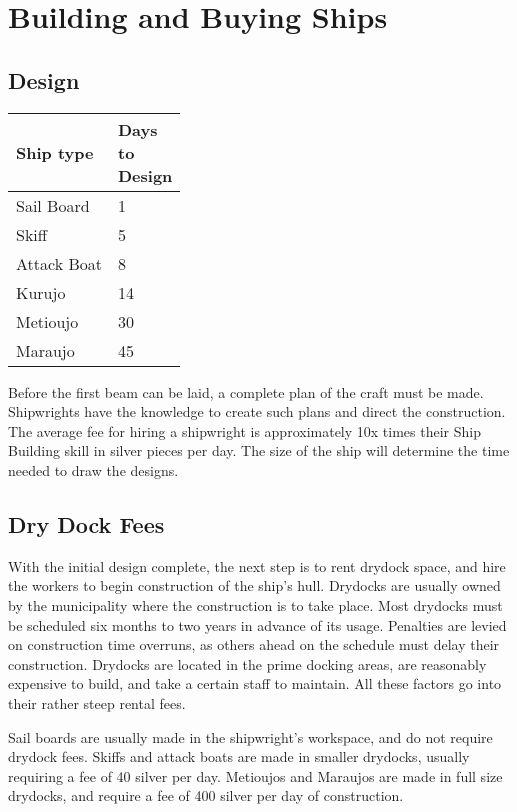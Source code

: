 \section{Building and Buying Ships}
\subsection{Design}

\begin{normbox}
\small
\begin{tabular}{@{} l l}
Ship type & \makecell[l]{Days\\to\\Design}\\
\midrule
Sail Board & 1\\
Skiff & 5\\
Attack Boat & 8\\
Kurujo & 14\\
Metioujo & 30\\
Maraujo & 45\\
\end{tabular}
\end{normbox}

Before the first beam can be laid, a complete plan of the craft must be made. Shipwrights have the knowledge to create such plans and direct the construction. The average fee
for hiring a shipwright is approximately 10x times their Ship Building skill in silver pieces per day. The size of the ship will determine the time needed to draw the designs.


\subsection{Dry Dock Fees}
With the initial design complete, the next step is to
rent drydock space, and hire the workers to begin construction of the ship's hull. Drydocks are usually owned by the municipality where the construction is to take place. Most drydocks must be scheduled six months to two years in advance of its usage. Penalties are levied on construction time overruns, as others ahead on the schedule must delay their construction. Drydocks are located in the prime docking areas, are reasonably expensive to build, and take a certain staff to maintain. All these factors go into their rather steep rental fees.

Sail boards are usually made in the shipwright's workspace, and do not require drydock fees. Skiffs and attack boats are made in smaller drydocks, usually requiring a fee of 40 silver per day. Metioujos and Maraujos are made in full size drydocks, and require a fee of 400 silver per day of construction.
